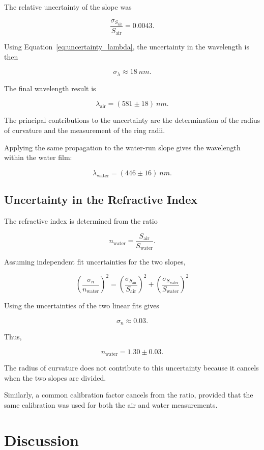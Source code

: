 \documentclass[12pt,a4paper]{article}
\begin{document}
The relative uncertainty of the slope was

\[
\frac{\sigma_{S_{\mathrm{air}}}}{S_{\mathrm{air}}}=0.0043.
\]

Using Equation~\ref{eq:uncertainty_lambda}, the uncertainty in the wavelength is then

\[
\sigma_\lambda\approx\SI{18}{nm}.
\]

The final wavelength result is

\[
\boxed{
\lambda_{\mathrm{air}}=(581\pm18)\ \si{nm}
}.
\]

The principal contributions to the
uncertainty are the determination of
the radius of curvature and the
measurement of the ring radii.

Applying the same propagation to the
water-run slope gives the wavelength
within the water film:

\[
\lambda_{\mathrm{water}}=(446\pm16)\ \si{nm}.
\]

\subsection{Uncertainty in the Refractive Index}

The refractive index is determined
from the ratio

\[
n_{\mathrm{water}}
=\frac{S_{\mathrm{air}}}{S_{\mathrm{water}}}.
\]

Assuming independent fit uncertainties
for the two slopes,

\[
\left(\frac{\sigma_n}{n_{\mathrm{water}}}\right)^2
=
\left(\frac{\sigma_{S_{\mathrm{air}}}}
{S_{\mathrm{air}}}\right)^2
+
\left(\frac{\sigma_{S_{\mathrm{water}}}}
{S_{\mathrm{water}}}\right)^2
\]

Using the uncertainties of the two linear fits gives

\[
\sigma_n\approx0.03.
\]

Thus,

\[
\boxed{
n_{\mathrm{water}}=1.30\pm0.03
}.
\]

The radius of curvature does not contribute to this uncertainty because it cancels when the two slopes are divided.

Similarly, a common calibration factor cancels from the ratio, provided that the same calibration was used for both the air and water measurements.

\newpage

\section{Discussion}
\end{document}
